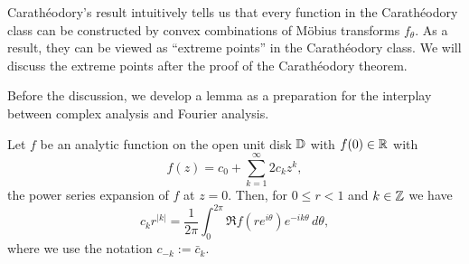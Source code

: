 \documentclass[a4paper]{article}
\begin{document}
Carath\'eodory's result intuitively tells us that every function in the Carath\'eodory class can be constructed by convex combinations of M\"obius transforms $f_\theta$.
As a result, they can be viewed as ``extreme points'' in the Carath\'eodory class.
We will discuss the extreme points after the proof of the Carath\'eodory theorem.

Before the discussion, we develop a lemma as a preparation for the interplay between complex analysis and Fourier analysis.

\begin{lem}
Let $f$ be an analytic function on the open unit disk $\mathbb{D}$ with $f(0)\in\mathbb{R}$ with
\[f(z)=c_0+\sum_{k=1}^\infty2c_kz^k,\]
the power series expansion of $f$ at $z=0$.
Then, for $0\le r<1$ and $k\in\mathbb{Z}$ we have
\[c_kr^{|k|}=\frac1{2\pi}\int_0^{2\pi}\Re f(re^{i\theta})e^{-ik\theta}\,d\theta,\]
where we use the notation $c_{-k}:=\bar c_k$.
\end{lem}
\end{document}
